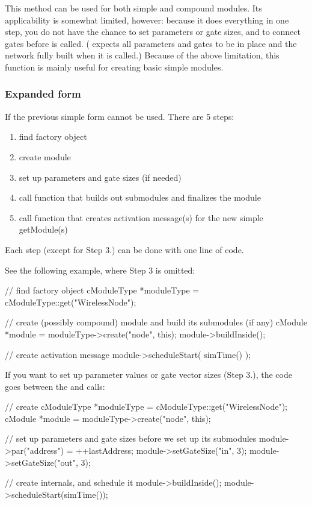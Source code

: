This method can be used for both simple and compound modules.
Its applicability is somewhat limited, however:
because it does everything in one step, you do not have the chance to
set parameters or gate sizes, and to connect gates before
 is called.
( expects all parameters and gates to
be in place and the network fully built when it is called.)
Because of the above limitation, this function is mainly useful
for creating basic simple modules.

%
%

\subsubsection{Expanded form}


If the previous simple form cannot be used. There are 5 steps:
\begin{enumerate}
  \item{find factory object}
  \item{create module}
  \item{set up parameters and gate sizes (if needed)}
  \item{call function that builds out submodules and finalizes the
    module}
  \item{call function that creates activation message(s) for the new
    simple getModule(s)}
\end{enumerate}
Each step (except for Step 3.) can be done with one line of code.



See the following example, where Step 3 is omitted:

\begin{cpp}
// find factory object
cModuleType *moduleType = cModuleType::get("WirelessNode");

// create (possibly compound) module and build its submodules (if any)
cModule *module = moduleType->create("node", this);
module->buildInside();

// create activation message
module->scheduleStart( simTime() );
\end{cpp}

If you want to set up parameter values or gate vector sizes (Step 3.),
the code goes between the  and
 calls:

\begin{cpp}
// create
cModuleType *moduleType = cModuleType::get("WirelessNode");
cModule *module = moduleType->create("node", this);

// set up parameters and gate sizes before we set up its submodules
module->par("address") = ++lastAddress;
module->setGateSize("in", 3);
module->setGateSize("out", 3);

// create internals, and schedule it
module->buildInside();
module->scheduleStart(simTime());
\end{cpp}


